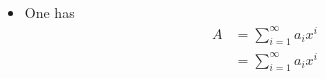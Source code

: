 \documentclass{beamer}
\begin{document}
\begin{frame}
\begin{itemize}
\item One has
  \vspace*{-1.05cm}
  \begin{align*}
    A &= \displaystyle\sum_{i=1}^\infty a_i x^i\\
      &= \displaystyle\sum_{i=1}^\infty a_i x^i
  \end{align*}
\end{itemize}
\end{frame}
\end{document}
